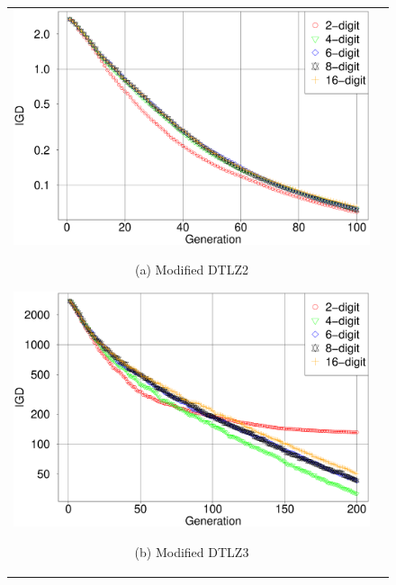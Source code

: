 \documentclass[../main/main]{subfiles}
\begin{document}
\begin{figure}[htbp]
\begin{tabular}{cc}
\begin{minipage}{0.32\hsize}
\includegraphics[width=1\linewidth]{../figures/NSGA-II/ano_DTLZ2_IGD.eps}
\begin{center}
{\footnotesize (a) Modified DTLZ2}
\end{center}
\end{minipage}
\begin{minipage}{0.32\hsize}
\includegraphics[width=1\linewidth]{../figures/NSGA-II/ano_DTLZ3_IGD.eps}
\begin{center}
{\footnotesize (b) Modified DTLZ3}
\end{center}
\end{minipage}
\begin{minipage}{0.32\hsize}

\end{minipage}
\end{tabular}
\end{figure}
\end{document}
